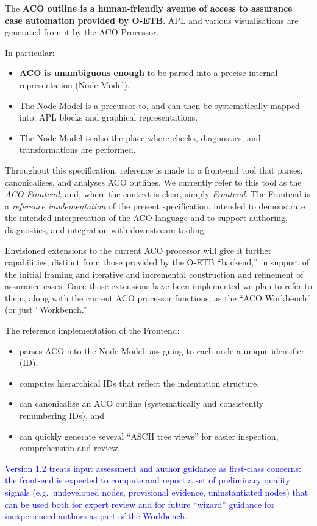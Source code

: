\documentclass[11pt]{article}
\begin{document}
The \textbf{ACO outline is a human-friendly avenue of access to assurance case automation provided by O-ETB}.
APL and various visualisations are generated from it by the ACO Processor.

In particular:
\begin{itemize}[leftmargin=2em]
  \item \textbf{ACO is unambiguous enough} to be parsed into a precise internal representation (Node Model).
  \item The Node Model is a precursor to, and can then be systematically mapped into, APL blocks and graphical representations.
  \item The Node Model is also the place where checks, diagnostics, and transformations are performed.
\end{itemize}

Throughout this specification, reference is made to a front-end tool that parses,
canonicalises, and analyses ACO outlines.
We currently refer to this tool as the
\emph{ACO Frontend}, and, where the
context is clear, simply \emph{Frontend}.
The Frontend is a \emph{reference implementation} of the present
specification, intended to demonstrate the intended interpretation of the ACO
language and to support authoring, diagnostics, and integration with downstream
tooling.

Envisioned extensions to the current ACO processor will give it further capabilities, distinct from those provided by the O-ETB ``backend,'' in support of the initial framing and iterative and incremental construction and refinement of assurance cases.
Once those extensions have been implemented we plan to refer to them, along with the current ACO processor functions, as the ``ACO Workbench'' (or just ``Workbench.''

The reference implementation of the Frontend:
\begin{itemize}[leftmargin=2em]
  \item parses ACO into the Node Model, assigning to each node a unique identifier (ID),
  \item computes hierarchical IDs that reflect the indentation structure,
  \item can canonicalise an ACO outline (systematically and consistently renumbering IDs), and
  \item can quickly generate several ``ASCII tree views'' for easier inspection, comprehension and review.
\end{itemize}

\textcolor{blue}{Version 1.2 treats input assessment and author guidance as first-class concerns: the front-end is expected to compute and report a set of preliminary quality signals (e.g.\ undeveloped nodes, provisional evidence, uninstantiated nodes) that can be used both for expert review and for future ``wizard'' guidance for inexperienced authors as part of the Workbench.}
\end{document}
